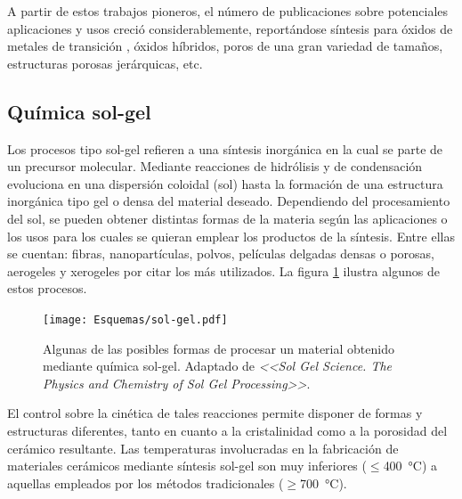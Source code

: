      A partir de estos trabajos pioneros, el número de publicaciones sobre potenciales aplicaciones y usos creció considerablemente, reportándose síntesis para óxidos de metales de transición \cite{Ciesla1996,Ulagappan1996,Antonelli1995}, óxidos híbridos, poros de una gran variedad de tamaños, estructuras porosas jerárquicas, etc.\cite{Soler-Illia2006,Moller1998} %
   
	\subsection{Química sol-gel}

	 Los procesos tipo sol-gel refieren a una síntesis inorgánica en la cual se parte de un precursor molecular. Mediante reacciones de hidrólisis y de condensación evoluciona en una dispersión coloidal (sol) hasta la formación de una estructura inorgánica tipo gel o densa del material deseado. Dependiendo del procesamiento del sol, se pueden obtener distintas formas de la materia según las aplicaciones o los usos para los cuales se quieran emplear los productos de la síntesis.\cite{Brinker1990} Entre ellas se cuentan: fibras, nanopartículas, polvos, películas delgadas densas o porosas, aerogeles y xerogeles por citar los más utilizados. La figura \ref{fig:sol-gel-process} ilustra algunos de estos procesos.

	 		\begin{figure}[ht!]
 				\begin{center}
 				\texttt{[image: Esquemas/sol-gel.pdf]}
 				\caption{Algunas de las posibles formas de procesar un material obtenido mediante química sol-gel. Adaptado de \textit{<<Sol Gel Science. The Physics and Chemistry of Sol Gel Processing>>}.\cite{Brinker1990}}
 				\label{fig:sol-gel-process}
 		   	    \end{center}
 		   	    \end{figure}

	 El control sobre la cinética de tales reacciones permite disponer de formas y estructuras diferentes, tanto en cuanto a la cristalinidad como a la porosidad del cerámico resultante. Las temperaturas involucradas en la fabricación de materiales cerámicos mediante síntesis sol-gel son muy inferiores ($\leq$\SI{400}{\celsius}) a aquellas empleados por  los métodos tradicionales ($\geq$\SI{700}{\celsius}).\cite{Brinker1990,Jolivet2000,Wright2001}


